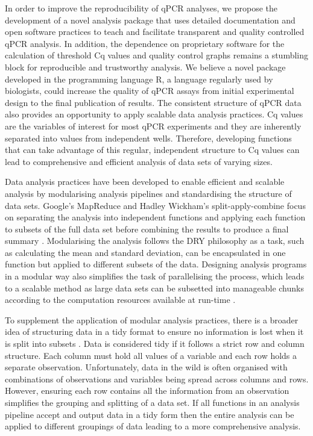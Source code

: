 \documentclass[../main.tex]{subfiles}
\begin{document}
In order to improve the reproducibility of qPCR analyses, we propose the development of a novel analysis package that uses detailed documentation and open software practices to teach and facilitate transparent and quality controlled qPCR analysis. 
In addition, the dependence on proprietary software for the calculation of threshold Cq values and quality control graphs remains a stumbling block for reproducible and trustworthy analysis. 
We believe a novel package developed in the programming language R, a language regularly used by biologists, could increase the quality of qPCR assays from initial experimental design to the final publication of results.
The consistent structure of qPCR data also provides an opportunity to apply scalable data analysis practices.
Cq values are the variables of interest for most qPCR experiments and they are inherently separated into values from independent wells. 
Therefore, developing functions that can take advantage of this regular, independent structure to Cq values can lead to comprehensive and efficient analysis of data sets of varying sizes.

Data analysis practices have been developed to enable efficient and scalable analysis by modularising analysis pipelines and standardising the structure of data sets.
Google's MapReduce and Hadley Wickham's split-apply-combine focus on separating the analysis into independent functions and applying each function to subsets of the full data set before combining the results to produce a final summary \parencite{Wickham2011,Dean2004}.
Modularising the analysis follows the DRY philosophy as a task, such as calculating the mean and standard deviation, can be encapsulated in one function but applied to different subsets of the data.
Designing analysis programs in a modular way also simplifies the task of parallelising the process, which leads to a scalable method as large data sets can be subsetted into manageable chunks according to the computation resources available at run-time \parencite{Chua2004}.

To supplement the application of modular analysis practices, there is a broader idea of structuring data in a tidy format to ensure no information is lost when it is split into subsets \parencite{Wickham2014}. 
Data is considered tidy if it follows a strict row and column structure. 
Each column must hold all values of a variable and each row holds a separate observation.
Unfortunately, data in the wild is often organised with combinations of observations and variables being spread across columns and rows.
However, ensuring each row contains all the information from an observation simplifies the grouping and splitting of a data set.
If all functions in an analysis pipeline accept and output data in a tidy form then the entire analysis can be applied to different groupings of data leading to a more comprehensive analysis.
\end{document}
